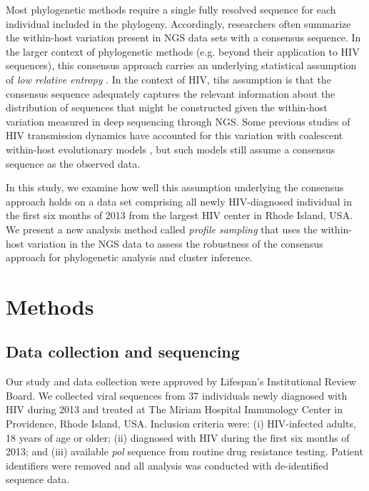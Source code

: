 \documentclass[letterpaper]{article}
\begin{document}
Most phylogenetic methods require a single fully resolved sequence for each individual included in the phylogeny. Accordingly, researchers often summarize the within-host variation present in NGS data sets with a consensus sequence. In the larger context of phylogenetic methods (e.g. beyond their application to HIV sequences), this consensus approach carries an underlying statistical assumption of \emph{low relative entropy} \parencite{guang}. In the context of HIV, tihs assumption is that the consensus sequence adequately captures the relevant information about the distribution of sequences that might be constructed given the within-host variation measured in deep sequencing through NGS. Some previous studies of HIV transmission dynamics have accounted for this variation with coalescent within-host evolutionary models \parencite{giardina, romero-severson}, but such models still assume a consensus sequence as the observed data.

In this study, we examine how well this assumption underlying the consensus approach holds on a data set comprising all newly HIV-diagnosed individual in the first six months of 2013 from the largest HIV center in Rhode Island, USA. We present a new analysis method called \emph{profile sampling} that uses the within-host variation in the NGS data to assess the robustness of the consensus approach for phylogenetic analysis and cluster inference.

\section*{Methods}

\subsection*{Data collection and sequencing}

Our study and data collection were approved by Lifespan's Institutional Review Board. We collected viral sequences from 37 individuals newly diagnosed with HIV during 2013 and treated at The Miriam Hospital Immunology Center in Providence, Rhode Island, USA. Inclusion criteria were: (i) HIV-infected adults, 18 years of age or older; (ii) diagnosed with HIV during the first six months of 2013; and (iii) available \emph{pol} sequence from routine drug resistance testing. Patient identifiers were removed and all analysis was conducted with de-identified sequence data.
\end{document}
